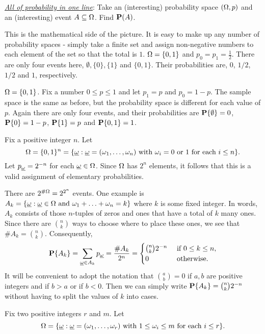 \documentclass[preprint,  11pt]{amsart}
\def\omeg{\underline{\ome}}
\begin{document}
{\em\underline{ All of probability in one line}}: Take an (interesting) probability space $(\Ome, p)$ and an (interesting) event $A\subseteq \Ome$. Find $\P(A)$.



\vspace{2mm}
This is the mathematical side of the picture. It is easy to make up any number of probability spaces -  simply take a finite set and assign non-negative numbers to each element of the set so that the total is $1$.
\beg $\Ome=\{0,1\}$ and $p_{0}=p_{1}=\frac{1}{2}$. There are only four events here, $\emptyset, \{0\}, \{1\}$ and $\{0,1\}$. Their probabilities are, $0$, $1/2$, $1/2$ and $1$, respectively.
\eeg

\beg\label{eg:onecointoss} $\Ome=\{0,1\}$. Fix a number $0\le p \le 1$ and let $p_{1}=p$ and $p_{0}=1-p$. The sample space is the same as before, but the probability space is different for each value of $p$. Again there are only four events, and their probabilities are $\P\{\emptyset\}=0$, $\P\{0\}=1-p$, $\P\{1\}=p$ and $\P\{0,1\}=1$.
\eeg

\beg\label{eg:ncointosses} Fix a positive integer $n$. Let $$\Ome=\{0,1\}^{n}=\{\omeg\suchthat \omeg=(\ome_{1},\ldots ,\ome_{n})\mb{ with }\ome_{i}=0\mb{ or }1\mb{ for each }i\le n\}.$$
Let $p_{\omeg}=2^{-n}$ for each $\omeg\in \Ome$. Since $\Ome$ has $2^{n}$ elements, it follows that this is a valid assignment of elementary probabilities.

There are $2^{\#\Ome}=2^{2^{n}}$ events. One example is $A_{k}=\{\omeg\suchthat \omeg\in \Ome \mb{ and } \ome_{1}+\ldots +\ome_{n}=k
\}$ where $k$ is some fixed integer. In words, $A_{k}$ consists of those $n$-tuples of zeros and ones that have a total of $k$ many ones. Since there are $\binom{n}{k}$ ways to choose where to place these ones, we see that $\#A_{k}=\binom{n}{k}$. Consequently,
$$
\P\{A_{k}\}=\sum_{\omeg\in A_{k}}p_{\omeg} = \frac{\# A_{k}}{2^{n}}=\begin{cases} \binom{n}{k}2^{-n} &\mb{ if }0\le k\le n, \\ 0 & \mb{ otherwise}. \end{cases}
$$
It will be convenient to adopt the notation that $\binom{a}{b}=0$ if $a,b$ are positive integers and if $b>a$ or if $b<0$. Then we can simply write $\P\{A_{k}\}=\binom{n}{k}2^{-n}$ without having to split the values of $k$ into cases.
\eeg

\beg\label{eg:rballsinmbins} Fix two positive integers $r$ and $m$. Let
$$\Ome=\{\omeg\suchthat \omeg=(\ome_{1},\ldots ,\ome_{r}) \mb{ with }1\le \ome_{i} \le m \mb{ for each }i\le r\}.$$
\end{document}
